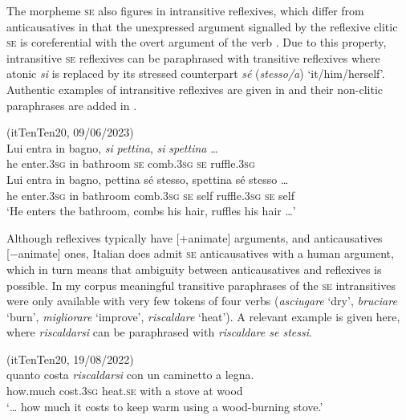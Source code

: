 \documentclass[output=paper,colorlinks,citecolor=brown
]{langscibook}
\begin{document}
The morpheme \textsc{se} also figures in intransitive reflexives, which differ from anticausatives in that the unexpressed argument signalled by the reflexive clitic \textsc{se} is coreferential with the overt argument of the verb \citep[257, 126--136]{vanvalin1990semantic,bentley2006split}. Due to this property, intransitive \textsc{se} reflexives can be paraphrased with transitive reflexives where atonic \textit{si} is replaced by its stressed counterpart \textit{sé} (\textit{stesso/a}) ‘it/him/herself’. Authentic examples of intransitive reflexives are given in  and their non-clitic paraphrases are added in .


\ea \label{bentley_example_4}(itTenTen20, 09/06/2023)\\
    \ea \label{bentley_example_4a}
    \gll Lui entra in bagno, \textit{si} \textit{pettina}, \textit{si} \textit{spettina} \ldots\\
    he enter.3\textsc{sg} in bathroom \textsc{se} comb.3\textsc{sg} \textsc{se} ruffle.3\textsc{sg} \\
    \ex \label{bentley_example_4b}
    \gll Lui entra in bagno, pettina sé stesso, spettina sé stesso \ldots  \\
    he enter.3\textsc{sg} in bathroom comb.3\textsc{sg} \textsc{se} self ruffle.3\textsc{sg} \textsc{se} self  \\
    \glt ‘He enters the bathroom, combs his hair, ruffles his hair  \ldots ’  \\
    \z
\z

Although reflexives typically have [+animate] arguments, and anticausatives [−animate] ones, Italian does admit \textsc{se} anticausatives with a human argument, which in turn means that ambiguity between anticausatives and reflexives is possible. In my corpus meaningful transitive paraphrases of the \textsc{se} intransitives were only available with very few tokens of four verbs (\textit{asciugare} ‘dry’, \textit{bruciare} ‘burn’, \textit{migliorare} ‘improve’, \textit{riscaldare} ‘heat’). A relevant example is given here, where \textit{riscaldarsi} can be paraphrased with \textit{riscaldare se stessi}.

\ea \label{bentley_example_5}(itTenTen20, 19/08/2022)\\
\gll  {\ldots}  quanto costa \textit{riscaldarsi} con un caminetto a legna.\\
      {}        how.much cost.3\textsc{sg} heat.\textsc{se} with a stove at wood\\
\glt `\ldots{}  how much it costs to keep warm using a wood-burning stove.’
\z
\end{document}
